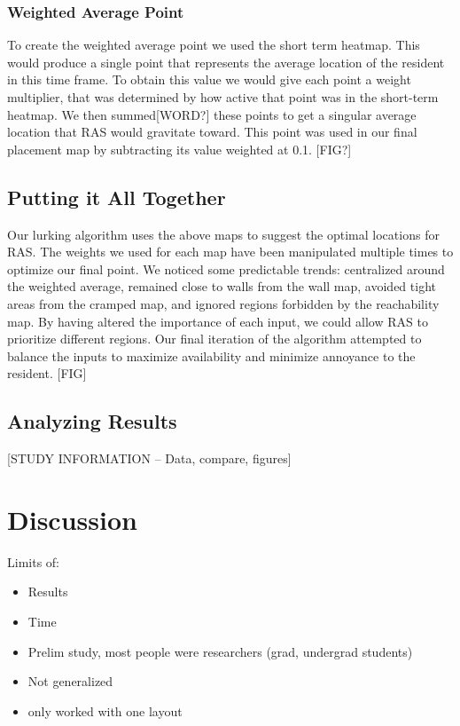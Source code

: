 \documentclass[11pt, draft, a4paper]{IEEEtran}
\begin{document}
\subsubsection{Weighted Average Point}
To create the weighted average point we used the short term heatmap. This would produce a single point that represents the average location of the resident in this time frame. To obtain this value we would give each point a weight multiplier, that was determined by how active that point was in the short-term heatmap. We then summed[WORD?] these points to get a singular average location that RAS would gravitate toward. This point was used in our final placement map by subtracting its value weighted at 0.1. [FIG?]


\subsection{Putting it All Together}
Our lurking algorithm uses the above maps to suggest the optimal locations for RAS. The weights we used for each map have been manipulated multiple times to optimize our final point. We noticed some predictable trends: centralized around the weighted average, remained close to walls from the wall map, avoided tight areas from the cramped map, and ignored regions forbidden by the reachability map. By having altered the importance of each input, we could allow RAS to prioritize different regions. Our final iteration of the algorithm attempted to balance the inputs to maximize availability and minimize annoyance to the resident. [FIG]


\subsection{Analyzing Results}
[STUDY INFORMATION -- Data, compare, figures]


\section{Discussion}
Limits of:
\begin{itemize}
    \item Results
    \item Time
    \item Prelim study, most people were researchers (grad, undergrad students)
    \item Not generalized
    \item only worked with one layout
\end{itemize}
\end{document}
